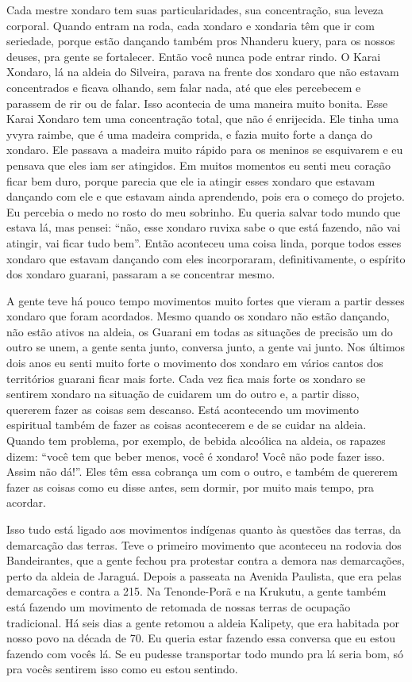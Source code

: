 Cada mestre xondaro tem suas particularidades, sua concentração, sua
leveza corporal. Quando entram na roda, cada xondaro e xondaria têm que
ir com seriedade, porque estão dançando também pros Nhanderu kuery, para
os nossos deuses, pra gente se fortalecer. Então você nunca pode entrar
rindo. O Karai Xondaro, lá na aldeia do Silveira, parava na frente dos
xondaro que não estavam concentrados e ficava olhando, sem falar nada,
até que eles percebecem e parassem de rir ou de falar. Isso acontecia
de uma maneira muito bonita. Esse Karai Xondaro tem uma concentração
total, que não é enrijecida. Ele tinha uma yvyra raimbe, que é uma
madeira comprida, e fazia muito forte a dança do xondaro. Ele passava a
madeira muito rápido para os meninos se esquivarem e eu pensava que
eles iam ser atingidos. Em muitos momentos eu senti meu coração ficar
bem duro, porque parecia que ele ia atingir esses xondaro que estavam
dançando com ele e que estavam ainda aprendendo, pois era o começo do
projeto. Eu percebia o medo no rosto do meu sobrinho. Eu queria salvar
todo mundo que estava lá, mas pensei: ``não, esse xondaro ruvixa sabe o
que está fazendo, não vai atingir, vai ficar tudo bem''. Então aconteceu
uma coisa linda, porque todos esses xondaro que estavam dançando com
eles incorporaram, definitivamente, o espírito dos xondaro guarani,
passaram a se concentrar mesmo.

A gente teve há pouco tempo movimentos muito fortes que vieram a partir
desses xondaro que foram acordados. Mesmo quando os xondaro não estão
dançando, não estão ativos na aldeia, os Guarani em todas as situações
de precisão um do outro se unem, a gente senta junto, conversa junto, a
gente vai junto. Nos últimos dois anos eu senti muito forte o movimento
dos xondaro em vários cantos dos territórios guarani ficar mais forte.
Cada vez fica mais forte os xondaro se sentirem xondaro na situação de
cuidarem um do outro e, a partir disso, quererem fazer as coisas sem
descanso. Está acontecendo um movimento espiritual também de fazer as
coisas acontecerem e de se cuidar na aldeia. Quando tem problema, por
exemplo, de bebida alcoólica na aldeia, os rapazes dizem: ``você tem que
beber menos, você é xondaro! Você não pode fazer isso. Assim não dá!''.
Eles têm essa cobrança um com o outro, e também de quererem fazer as
coisas como eu disse antes, sem dormir, por muito mais tempo, pra
acordar.

Isso tudo está ligado aos movimentos indígenas quanto às questões das
terras, da demarcação das terras. Teve o primeiro movimento que
aconteceu na rodovia dos Bandeirantes, que a gente fechou pra protestar
contra a demora nas demarcações, perto da aldeia de Jaraguá. Depois a
passeata na Avenida Paulista, que era pelas demarcações e contra a 
215. Na Tenonde-Porã e na Krukutu, a gente também está fazendo um
movimento de retomada de nossas terras de ocupação tradicional. Há seis
dias a gente retomou a aldeia Kalipety, que era habitada por nosso povo
na década de 70. Eu queria estar fazendo essa conversa que eu estou
fazendo com vocês lá. Se eu pudesse transportar todo mundo pra lá seria
bom, só pra vocês sentirem isso como eu estou sentindo.

